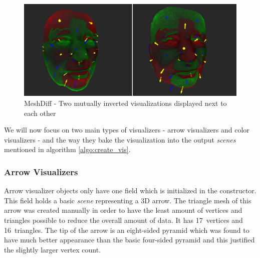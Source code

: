 \begin{figure}[h]
\centering
	\includegraphics[width=\textwidth]{./img/mesh_diff-inverted_vis.png}
    \caption[MeshDiff - Two mutually inverted visualizations]{MeshDiff - Two mutually inverted visualizations displayed next to each other}
    \label{fig:meshdiff-inverted_vis}
\end{figure}

We will now focus on two main types of visualizers - arrow visualizers and color visualizers - and the way they bake the visualization into the output {\it scenes} mentioned in algorithm \ref{algo:create_vis}.

\subsubsection{Arrow Visualizers}

Arrow visualizer objects only have one field which is initialized in the constructor. This field holds a basic {\it scene} representing a 3D arrow. The triangle mesh of this arrow was created manually in order to have the least amount of vertices and triangles possible to reduce the overall amount of data. It has 17~vertices and 16~triangles. The tip of the arrow is an eight-sided pyramid which was found to have much better appearance than the basic four-sided pyramid and this justified the slightly larger vertex count.

